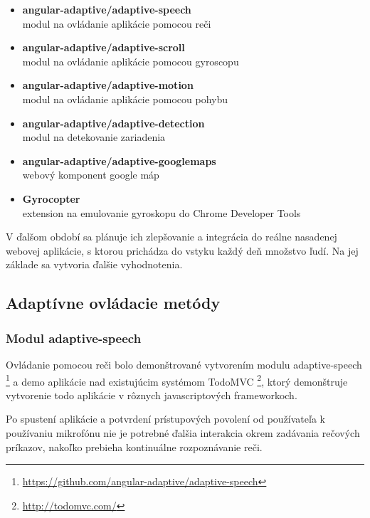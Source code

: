 \begin{itemize}
  \item \textbf{angular-adaptive/adaptive-speech}\\
    modul na ovládanie aplikácie pomocou reči
  \item \textbf{angular-adaptive/adaptive-scroll}\\
    modul na ovládanie aplikácie pomocou gyroscopu
  \item \textbf{angular-adaptive/adaptive-motion}\\
    modul na ovládanie aplikácie pomocou pohybu
  \item \textbf{angular-adaptive/adaptive-detection}\\
    modul na detekovanie zariadenia
  \item \textbf{angular-adaptive/adaptive-googlemaps}\\
    webový komponent google máp

  \item \textbf{Gyrocopter}\\
    extension na emulovanie gyroskopu do Chrome Developer Tools
\end{itemize}

V ďalšom období sa plánuje ich zlepšovanie a integrácia do reálne nasadenej webovej aplikácie, s ktorou prichádza do vstyku každý deň množstvo ľudí. Na jej základe sa vytvoria ďalšie vyhodnotenia.

\newpage
\subsection{Adaptívne ovládacie metódy} %
\label{sub:adapt_vne_ovl_dacie_met_dy}

\subsubsection{Modul adaptive-speech} %
\label{sub:adaptive_speech}

Ovládanie pomocou reči bolo demonštrované vytvorením modulu adaptive-speech \footnote{\url{https://github.com/angular-adaptive/adaptive-speech}} a demo aplikácie nad existujúcim systémom TodoMVC \footnote{\url{http://todomvc.com/}}, ktorý demonštruje vytvorenie todo aplikácie v rôznych javascriptových frameworkoch. 

Po spustení aplikácie a potvrdení prístupových povolení od používateľa k používaniu mikrofónu nie je potrebné ďalšia interakcia okrem zadávania rečových príkazov, nakoľko prebieha kontinuálne rozpoznávanie reči.

